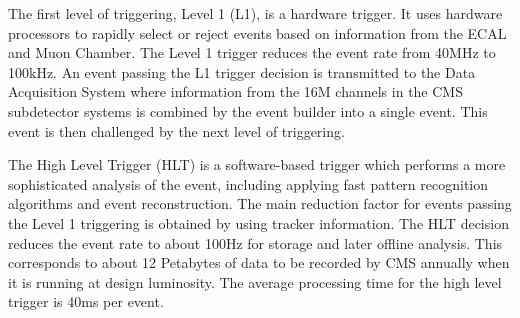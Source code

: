 The first level of triggering, Level 1 (L1), is a hardware trigger.
It uses hardware processors to rapidly select or reject events based on information from the ECAL and Muon Chamber. 
The Level 1 trigger reduces the event rate from 40MHz to 100kHz.
An event passing the L1 trigger decision is transmitted to the Data Acquisition System where information from the 16M channels in the CMS subdetector systems is combined by the event builder into a single event. 
This event is then challenged by the next level of triggering.

The High Level Trigger (HLT) is a software-based trigger which performs a more sophisticated analysis of the event, including applying fast pattern recognition algorithms and event reconstruction. 
The main reduction factor for events passing the Level 1 triggering is obtained by using tracker information. 
The HLT decision reduces the event rate to about 100Hz for storage and later offline analysis. 
This corresponds to about 12 Petabytes of data to be recorded by CMS annually when it is running at design luminosity. 
The average processing time for the high level trigger is 40ms per event.
